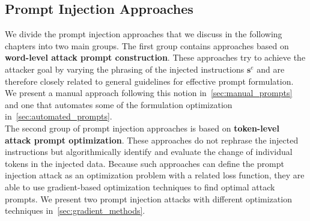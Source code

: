 \subsection{Prompt Injection Approaches} \label{sec:injection_approaches}
We divide the prompt injection approaches that we discuss in the following chapters into two main groups.
The first group contains approaches based on \textbf{word-level attack prompt construction}.
These approaches try to achieve the attacker goal by varying the phrasing of the injected instructions $\textbf{s}^e$ and are therefore closely related to general guidelines for effective prompt formulation.
We present a manual approach following this notion in~\cref{sec:manual_prompts} and one that automates some of the formulation optimization in~\cref{sec:automated_prompts}.\\

The second group of prompt injection approaches is based on \textbf{token-level attack prompt optimization}.
These approaches do not rephrase the injected instructions but algorithmically identify and evaluate the change of individual tokens in the injected data.
Because such approaches can define the prompt injection attack as an optimization problem with a related loss function, they are able to use gradient-based optimization techniques to find optimal attack prompts.
We present two prompt injection attacks with different optimization techniques in~\cref{sec:gradient_methods}.
